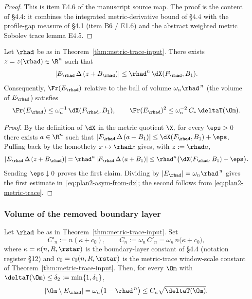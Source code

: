 \begin{proof}
This is item E4.6 of the manuscript source map. The proof is the
content of \S4.4: it combines the integrated metric-derivative bound
of \S4.4 with the profile-gap measure of \S4.1 (item B6 / E1.6) and
the abstract weighted metric Sobolev trace lemma E4.5.
\end{proof}

\begin{lemma}
\label{lem:plan2-dX-to-asym}
Let $\rhad$ be as in Theorem~\ref{thm:metric-trace-input}. There
exists $z=z(\rhad)\in\R^n$ such that
\[
   |E_{\rhad}\,\Delta\,(z+B_{\rhad})|
   \le \rhad^{n}\,\dX(F_{\rhad},B_1).
\]
Consequently, $\Fr(E_{\rhad})$ relative to the ball of volume
$\omega_n\rhad^{\,n}$ (the volume of $E_{\rhad}$) satisfies
\begin{equation}\label{eq:plan2-asym-from-dx}
   \Fr(E_{\rhad})\le \omega_n^{-1}\,\dX(F_{\rhad},B_1),
   \qquad
   \Fr(E_{\rhad})^{2}\le
   \omega_n^{-2}\,C_*\,\deltaT(\Om).
\end{equation}
\end{lemma}

\begin{proof}
By the definition of $\dX$ in the metric quotient
$\X$, for every $\eps>0$ there exists $a\in\R^n$ such that
$|F_{\rhad}\,\Delta\,(a+B_1)|\le \dX(F_{\rhad},B_1)+\eps$. Pulling
back by the homothety $x\mapsto \rhad x$ gives, with $z:=\rhad a$,
\[
   |E_{\rhad}\,\Delta\,(z+B_{\rhad})|
   =\rhad^{n}\,|F_{\rhad}\,\Delta\,(a+B_1)|
   \le \rhad^{n}\bigl(\dX(F_{\rhad},B_1)+\eps\bigr).
\]
Sending $\eps\downarrow 0$ proves the first claim. Dividing by
$|E_{\rhad}|=\omega_n\rhad^{\,n}$ gives the first estimate
in~\eqref{eq:plan2-asym-from-dx}; the second follows from
\eqref{eq:plan2-metric-trace}.
\end{proof}

\subsubsection{Volume of the removed boundary layer}
\label{sssec:plan2-layer-volume}

\begin{lemma}
\label{lem:plan2-layer-vol}
Let $\rhad$ be as in Theorem~\ref{thm:metric-trace-input}. Set
\begin{equation}\label{eq:plan2-Cprime-def}
   C'_n:=n(\kappa+c_0),
   \qquad C_n:=\omega_n\,C'_n
   =\omega_n\,n\bigl(\kappa+c_0\bigr),
\end{equation}
where $\kappa=\kappa(n,R,\rstar)$ is the boundary-layer constant of
\S4.4 (notation register \S12) and $c_0=c_0(n,R,\rstar)$ is the
metric-trace window-scale constant of
Theorem~\ref{thm:metric-trace-input}. Then, for every $\Om$ with
$\deltaT(\Om)\le \delta_2:=\min\{1,\delta_1\}$,
\begin{equation}\label{eq:plan2-layer-vol}
   |\Om\setminus E_{\rhad}|
   =\omega_n\bigl(1-\rhad^{\,n}\bigr)
   \le C_n\sqrt{\deltaT(\Om)}.
\end{equation}
\end{lemma}

